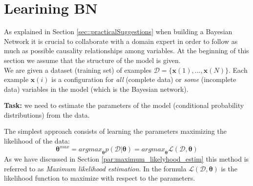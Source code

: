 \chapter{Learining BN}
\label{cha:learning_BN}
As explained in Section \ref{sec::practicalSuggestions} when building a Bayesian Network it is crucial to collaborate with a domain expert in order to follow as much as possible causality relationships among variables. At the beginning of this section we assume that the structure of the model is given.\\
We are given a dataset (training set) of examples $\mathcal{D} = \{\pmb{x}(1), ..., \pmb{x}(N)\}$. Each example $\pmb{x}(i)$ is a configuration for \textit{all} (complete data) or \textit{some} (incomplete data) variables in the model (which is the Bayesian network). \newline

\textbf{Task:} we need to estimate the parameters of the model (conditional probability distributions) from the data. \newline

The simplest approach consists of learning the parameters maximizing the likelihood of the data:
$${\pmb{\theta}}^{\mathit{max}} = {\mathit{argmax}}_{\pmb{\theta}} p(\mathcal{D}|\pmb{\theta}) = \mathit{argmax}_{\pmb{\theta}} \mathcal{L} (\mathcal{D}, \pmb{\theta})$$
As we have discussed in Section \ref{par:maximum_likelyhood_estim} this method is referred to as \textit{Maximum likelihood estimation}. In the formula $\mathcal{L} (\mathcal{D}, \pmb{\theta})$ is the likelihood function to maximize with respect to the parameters. \newline

